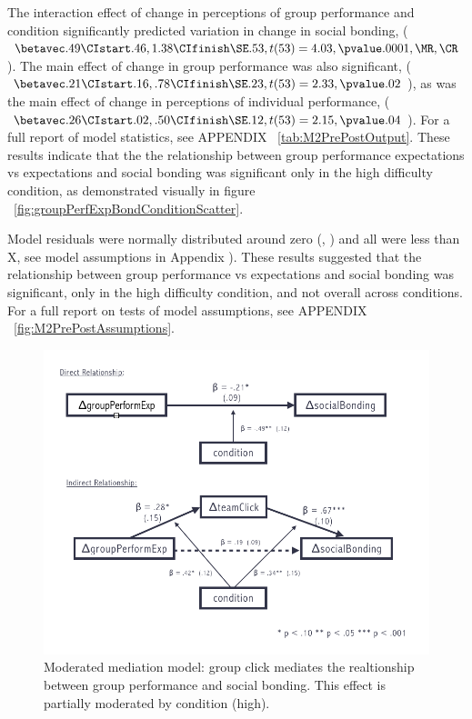 The interaction effect of change in perceptions of group performance and condition significantly predicted variation in change in social bonding, ($\betavec .49 \CIstart .46, 1.38 \CIfinish \SE .53, t(53) = 4.03, \pvalue .0001, \MR , \CR $). The main effect of change in group performance was also significant, ($\betavec .21 \CIstart .16, .78 \CIfinish \SE.23, t(53) = 2.33, \pvalue .02$), as was the main effect of change in perceptions of individual performance, ($\betavec .26 \CIstart .02, .50 \CIfinish \SE.12, t(53) = 2.15, \pvalue .04$).
For a full report of model statistics, see APPENDIX ~\ref{tab:M2PrePostOutput}.  These results indicate that the the relationship between group performance expectations vs expectations and social bonding was significant only in the high difficulty condition, as demonstrated visually in figure ~\ref{fig:groupPerfExpBondConditionScatter}.

Model residuals were normally distributed around zero (\resdist , \pvalue ) and all \cooksD were less than X, see model assumptions in Appendix  ).  These results suggested that the relationship between  group performance vs expectations and social bonding was significant, only in the high difficulty condition, and not overall across conditions. For a full report on tests of model assumptions, see APPENDIX ~\ref{fig:M2PrePostAssumptions}.











\begin{figure}
  \centering
  \includegraphics[width=0.9\linewidth,keepaspectratio] {images/prePostExperimentChangeModMedFigure}
  \caption{Moderated mediation model: group click mediates the realtionship between group performance and social bonding.  This effect is partially moderated by condition (high).}
  \label{fig:prePostExperimentChangeModMedFigure}
\end{figure}



